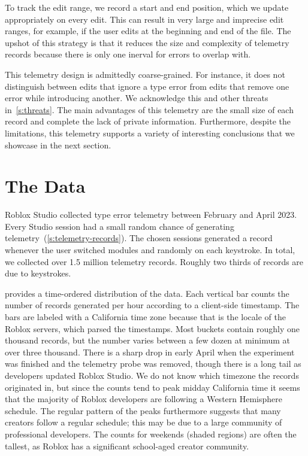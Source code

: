 \documentclass[english,submission,cleveref]{programming}
\begin{document}
To track the edit range, we record a start and end position, which we
update appropriately on every edit. This can result in very large and
imprecise edit ranges, for example, if the user edits at the beginning and end
of the file.
The upshot of this strategy is that it reduces the size and complexity of
telemetry records because there is only one inerval for errors to overlap with.

This telemetry design is admittedly coarse-grained.
For instance, it does not distinguish between edits that ignore a type
error from edits that remove one error while introducing another.
We acknowledge this and other threats in~\cref{s:threats}.
The main advantages of this telemetry are the small size of each record
and complete the lack of private information.
Furthermore, despite the limitations, this telemetry supports a variety of
interesting conclusions that we showcase in the next section.


\section{The Data}
\label{s:data}

Roblox Studio collected type error telemetry between February
and April 2023.
Every Studio session had a small random chance of generating
telemetry~(\cref{s:telemetry-records}).
The chosen sessions generated a record whenever the user switched modules and
randomly on each keystroke.
In total, we collected over 1.5 million telemetry records.
Roughly two thirds of records are due to keystrokes.

 provides a time-ordered distribution of the data.
Each vertical bar counts the number of records generated per hour according to
a client-side timestamp.
The bars are labeled with a California time zone because that is the locale of
the Roblox servers, which parsed the timestamps.
Most buckets contain roughly one thousand records, but the number
varies between a few dozen at minimum at over three thousand.
There is a sharp drop in early April when the experiment was finished
and the telemetry probe was removed, though there is a long tail as
developers updated {Roblox Studio}.
We do not know which timezone the records originated in, but since the counts
tend to peak midday California time it seems that the majority
of Roblox developers are following a Western Hemisphere schedule.
The regular pattern of the peaks furthermore suggests that many creators
follow a regular schedule; this may be due to a large community of
professional developers.
The counts for weekends (shaded regions) are often the tallest,
as Roblox has a significant school-aged creator community.
\end{document}
